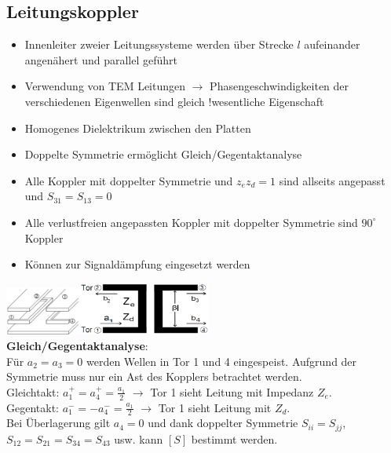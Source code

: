 \documentclass[english]{latex4ei/latex4ei_sheet}
\begin{document}
\begin{sectionbox}
    \subsection{Leitungskoppler}
    \begin{itemize}
        \item Innenleiter zweier Leitungssysteme werden über Strecke $l$ aufeinander angenähert und parallel geführt
        \item Verwendung von TEM Leitungen $\rightarrow$ Phasengeschwindigkeiten der verschiedenen Eigenwellen sind gleich !wesentliche Eigenschaft
        \item Homogenes Dielektrikum zwischen den Platten
        \item Doppelte Symmetrie ermöglicht Gleich/Gegentaktanalyse
        \item Alle Koppler mit doppelter Symmetrie und $z_ez_d = 1$ sind allseits angepasst und $S_{31} = S_{13} = 0$
        \item Alle verlustfreien angepassten Koppler mit doppelter Symmetrie sind $90^{\circ}$ Koppler
        \item Können zur Signaldämpfung eingesetzt werden
    \end{itemize}
    \includegraphics[width = 2.5cm]{./img/leitungskoppler1.png}\includegraphics[width = 4.3cm]{./img/leitungskoppler2.png}\\

    \textbf{Gleich/Gegentaktanalyse}:\\
    Für $a_2 = a_3 = 0$ werden Wellen in Tor 1 und 4 eingespeist. Aufgrund der Symmetrie muss nur ein Ast des Kopplers betrachtet werden.\\
    Gleichtakt: $a_1^+ = a_4^+ = \frac{a_1}{2}$ $\rightarrow$ Tor 1 sieht Leitung mit Impedanz $Z_e$.\\
    Gegentakt: $a_1^- = -a_4^- = \frac{a_1}{2}$ $\rightarrow$ Tor 1 sieht Leitung mit $Z_d$.\\
    Bei Überlagerung gilt $a_4 = 0$ und dank doppelter Symmetrie $S_{ii} = S_{jj}$, $S_{12} = S_{21} = S_{34} = S_{43}$ usw. kann $[S]$ bestimmt werden.


\end{sectionbox}
\end{document}
